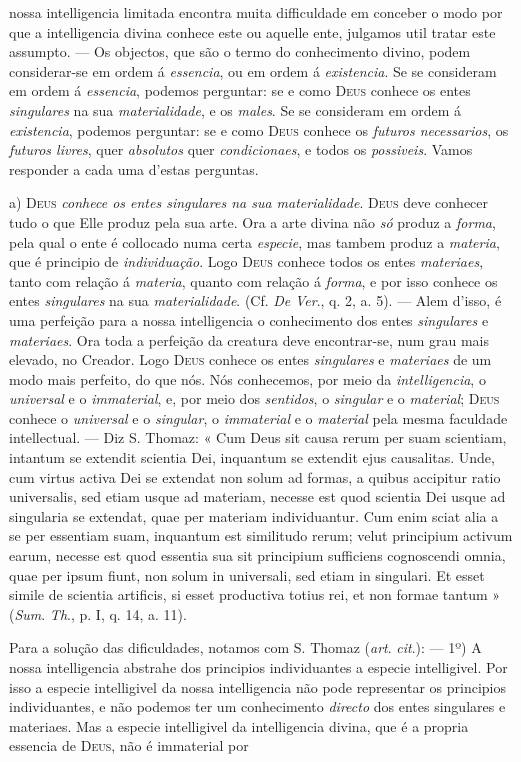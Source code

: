 nossa intelligencia limitada encontra muita difficuldade em conceber o modo por que a intelligencia divina conhece este ou aquelle ente, julgamos util tratar este assumpto. --- Os objectos, que são o termo do conhecimento divino, podem considerar-se em ordem á \emph{essencia}, ou em ordem á \emph{existencia}. Se se consideram em ordem á \emph{essencia}, podemos perguntar: se e como \textsc{Deus} conhece os entes \emph{singulares} na sua \emph{materialidade}, e os \emph{males}. Se se consideram em ordem á \emph{existencia}, podemos perguntar: se e como \textsc{Deus} conhece os \emph{futuros necessarios}, os \emph{futuros livres}, quer \emph{absolutos} quer \emph{condicionaes}, e todos os \emph{possiveis}. Vamos responder a cada uma d'estas perguntas.\par a) \textsc{Deus} \emph{conhece os entes singulares na sua materialidade}. \textsc{Deus} deve conhecer tudo o que Elle produz pela sua arte. Ora a arte divina não \emph{só} produz a \emph{forma}, pela qual o ente é collocado numa certa \emph{especie}, mas tambem produz a \emph{materia}, que é principio de \emph{individuação}. Logo \textsc{Deus} conhece todos os entes \emph{materiaes}, tanto com relação á \emph{materia}, quanto com relação á \emph{forma}, e por isso conhece os entes \emph{singulares} na sua \emph{materialidade}. (Cf. \emph{De} \emph{Ver}., q. 2, a. 5). --- Alem d'isso, é uma perfeição para a nossa intelligencia o conhecimento dos entes \emph{singulares} e \emph{materiaes}. Ora toda a perfeição da creatura deve encontrar-se, num grau mais elevado, no Creador. Logo \textsc{Deus} conhece os entes \emph{singulares} e \emph{materiaes} de um modo mais perfeito, do que nós. Nós conhecemos, por meio da \emph{intelligencia}, o \emph{universal} e o \emph{immaterial}, e, por meio dos \emph{sentidos}, o \emph{singular} e o \emph{material}; \textsc{Deus} conhece o \emph{universal} e o \emph{singular}, o \emph{immaterial} e o \emph{material} pela mesma faculdade intellectual. --- Diz S. Thomaz: « Cum Deus sit causa rerum per suam scientiam, intantum se extendit scientia Dei, inquantum se extendit ejus causalitas. Unde, cum virtus activa Dei se extendat non solum ad formas, a quibus accipitur ratio universalis, sed etiam usque ad materiam, necesse est quod scientia Dei usque ad singularia se extendat, quae per materiam individuantur. Cum enim sciat alia a se per essentiam suam, inquantum est similitudo rerum; velut principium activum earum, necesse est quod essentia sua sit principium sufficiens cognoscendi omnia, quae per ipsum fiunt, non solum in universali, sed etiam in singulari. Et esset simile de scientia artificis, si esset productiva totius rei, et non formae tantum » (\emph{Sum}. \emph{Th}., p. I, q. 14, a. 11).\par Para a solução das dificuldades, notamos com S. Thomaz (\emph{art}. \emph{cit}.): --- 1º) A nossa intelligencia abstrahe dos principios individuantes a especie intelligivel. Por isso a especie intelligivel da nossa intelligencia não pode representar os principios individuantes, e não podemos ter um conhecimento \emph{directo} dos entes singulares e materiaes. Mas a especie intelligivel da intelligencia divina, que é a propria essencia de \textsc{Deus}, não é immaterial por 